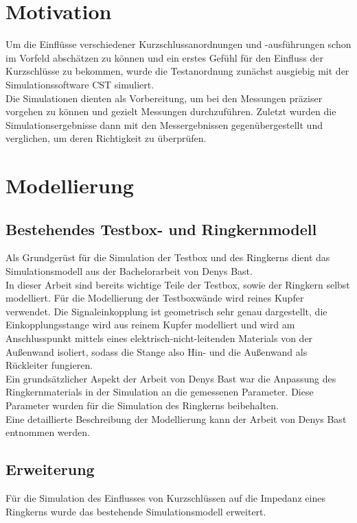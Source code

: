     \section{Motivation}
    Um die Einflüsse verschiedener Kurzschlussanordnungen und -ausführungen schon im Vorfeld abschätzen zu können und ein erstes Gefühl für den Einfluss der Kurzschlüsse zu bekommen, wurde die Testanordnung zunächst ausgiebig mit der Simulationssoftware CST simuliert.\\
    Die Simulationen dienten als Vorbereitung, um bei den Messungen präziser vorgehen zu können und gezielt Messungen durchzuführen. Zuletzt wurden die Simulationsergebnisse dann mit den Messergebnissen gegenübergestellt und verglichen, um deren Richtigkeit zu überprüfen.
    
    \section{Modellierung}
        \subsection{Bestehendes Testbox- und Ringkernmodell}
        Als Grundgerüst für die Simulation der Testbox und des Ringkerns dient das Simulationsmodell aus der Bachelorarbeit von Denys Bast.\\
        In dieser Arbeit sind bereits wichtige Teile der Testbox, sowie der Ringkern selbst modelliert. Für die Modellierung der Testboxwände wird reines Kupfer verwendet. Die Signaleinkopplung ist geometrisch sehr genau dargestellt, die Einkopplungsstange wird aus reinem Kupfer modelliert und wird am Anschlusspunkt mittels eines elektrisch-nicht-leitenden Materials von der Außenwand isoliert, sodass die Stange also Hin- und die Außenwand als Rückleiter fungieren.\\
        Ein grundsätzlicher Aspekt der Arbeit von Denys Bast war die Anpassung des Ringkernmaterials in der Simulation an die gemessenen Parameter. Diese Parameter wurden für die Simulation des Ringkerns beibehalten.\\
        Eine detaillierte Beschreibung der Modellierung kann der Arbeit von Denys Bast entnommen werden.
        
        \subsection{Erweiterung}
        Für die Simulation des Einflusses von Kurzschlüssen auf die Impedanz eines Ringkerns wurde das bestehende Simulationsmodell erweitert.
        
